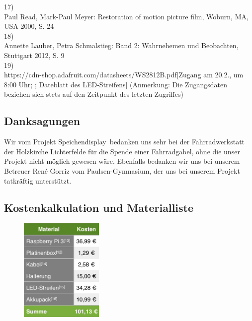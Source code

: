 \documentclass [a4paper, 11pt] {article}
\begin{document}
17)\\
Paul Read, Mark-Paul Meyer: \glqq Restoration of motion picture film\grqq, Woburn, MA, USA 2000, S. 24\\
18)\\
Annette Lauber, Petra Schmalstieg: \glqq Band 2: Wahrnehemen und Beobachten\grqq, Stuttgart 2012, S. 9\\
19) \\
https://cdn-shop.adafruit.com/datasheets/WS2812B.pdf[Zugang am 20.2., um 8:00 Uhr; ; Dateblatt des LED-Streifens]
(Anmerkung: Die Zugangsdaten beziehen sich stets auf den Zeitpunkt des letzten Zugriffes)

\subsection{Danksagungen}
Wir vom Projekt \glqq Speichendisplay\grqq\ bedanken uns sehr bei der Fahrradwerkstatt der Holzkirche Lichterfelde für die Spende einer Fahrradgabel, ohne die unser Projekt nicht möglich gewesen wäre. Ebenfalls bedanken wir uns bei unserem Betreuer René Gorriz vom Paulsen-Gymnasium, der uns bei unserem Projekt tatkräftig unterstützt.
\newpage
\subsection{Kostenkalkulation und Materialliste}
\begin{figure}[h]
	\centering
	\includegraphics[width=4cm]{tab.png}
\end{figure}
\end{document}

